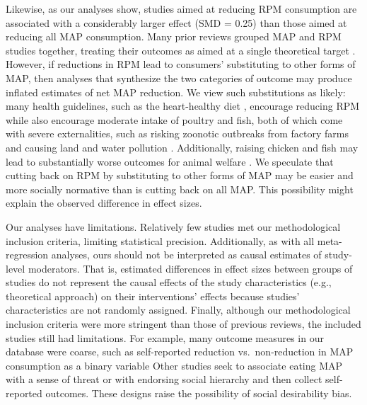 \documentclass[preprint, 3p,
authoryear]{elsarticle} %
\begin{document}
Likewise, as our analyses show, studies aimed at reducing RPM
consumption are associated with a considerably larger effect (SMD =
0.25) than those aimed at reducing all MAP consumption. Many prior
reviews grouped MAP and RPM studies together, treating their outcomes as
aimed at a single theoretical target \citep{slough2023}. However, if
reductions in RPM lead to consumers' substituting to other forms of MAP,
then analyses that synthesize the two categories of outcome may produce
inflated estimates of net MAP reduction. We view such substitutions as
likely: many health guidelines, such as the heart-healthy diet
\citep{diab2023}, encourage reducing RPM while also encourage moderate
intake of poultry and fish, both of which come with severe
externalities, such as risking zoonotic outbreaks from factory farms
\citep{hafez2020} and causing land and water pollution
\citep{grvzinic2023}. Additionally, raising chicken and fish may lead to
substantially worse outcomes for animal welfare
\citep{mathur2022ethical}. We speculate that cutting back on RPM by
substituting to other forms of MAP may be easier and more socially
normative than is cutting back on all MAP. This possibility might
explain the observed difference in effect sizes.

Our analyses have limitations. Relatively few studies met our
methodological inclusion criteria, limiting statistical precision.
Additionally, as with all meta-regression analyses, ours should not be
interpreted as causal estimates of study-level moderators. That is,
estimated differences in effect sizes between groups of studies do not
represent the causal effects of the study characteristics (e.g.,
theoretical approach) on their interventions' effects because studies'
characteristics are not randomly assigned. Finally, although our
methodological inclusion criteria were more stringent than those of
previous reviews, the included studies still had limitations. For
example, many outcome measures in our database were coarse, such as
self-reported reduction vs.~non-reduction in MAP consumption as a binary
variable \citep{aberman2018} Other studies seek to associate eating MAP
with a sense of threat \citep{fehrenbach2015} or with endorsing social
hierarchy \citep{allen2002} and then collect self-reported outcomes.
These designs raise the possibility of social desirability bias.
\end{document}
